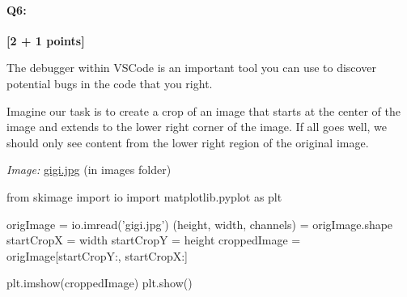 \documentclass[11pt]{article}
\begin{document}

\pagebreak
\paragraph{Q6:} \textbf{[2 + 1 points]}

The debugger within VSCode is an important tool you can use to discover potential bugs in the code that you right.

Imagine our task is to create a crop of an image that starts at the center of the image and extends to the lower right corner of the image. If all goes well, we should only see content from the lower right region of the original image.

\emph{Image:} \href{images/gigi.jpg}{gigi.jpg} (in images folder)

\begin{python}
from skimage import io
import matplotlib.pyplot as plt

origImage = io.imread('gigi.jpg')
(height, width, channels) = origImage.shape
startCropX = width %
startCropY = height %
croppedImage = origImage[startCropY:, startCropX:]

plt.imshow(croppedImage)
plt.show()
\end{python}
\end{document}
